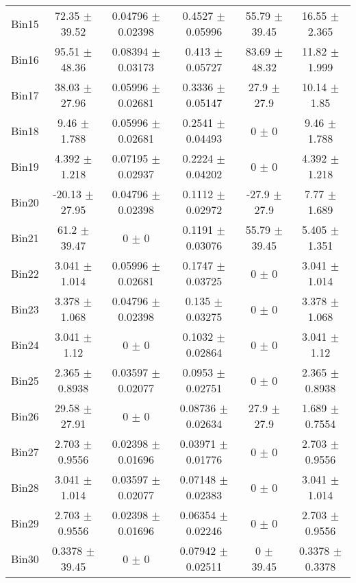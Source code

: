 \begin{tabular}{@{\extracolsep{4pt}}lccccc@{}}
     Bin15 & 72.35 $\pm$ 39.52 & 0.04796 $\pm$ 0.02398 & 0.4527 $\pm$ 0.05996 & 55.79 $\pm$ 39.45 & 16.55 $\pm$ 2.365 \\ 
     Bin16 & 95.51 $\pm$ 48.36 & 0.08394 $\pm$ 0.03173 & 0.413 $\pm$ 0.05727 & 83.69 $\pm$ 48.32 & 11.82 $\pm$ 1.999 \\ 
     Bin17 & 38.03 $\pm$ 27.96 & 0.05996 $\pm$ 0.02681 & 0.3336 $\pm$ 0.05147 & 27.9 $\pm$ 27.9 & 10.14 $\pm$ 1.85 \\ 
     Bin18 & 9.46 $\pm$ 1.788 & 0.05996 $\pm$ 0.02681 & 0.2541 $\pm$ 0.04493 & 0 $\pm$ 0 & 9.46 $\pm$ 1.788 \\ 
     Bin19 & 4.392 $\pm$ 1.218 & 0.07195 $\pm$ 0.02937 & 0.2224 $\pm$ 0.04202 & 0 $\pm$ 0 & 4.392 $\pm$ 1.218 \\ 
     Bin20 & -20.13 $\pm$ 27.95 & 0.04796 $\pm$ 0.02398 & 0.1112 $\pm$ 0.02972 & -27.9 $\pm$ 27.9 & 7.77 $\pm$ 1.689 \\ 
     Bin21 & 61.2 $\pm$ 39.47 & 0 $\pm$ 0 & 0.1191 $\pm$ 0.03076 & 55.79 $\pm$ 39.45 & 5.405 $\pm$ 1.351 \\ 
     Bin22 & 3.041 $\pm$ 1.014 & 0.05996 $\pm$ 0.02681 & 0.1747 $\pm$ 0.03725 & 0 $\pm$ 0 & 3.041 $\pm$ 1.014 \\ 
     Bin23 & 3.378 $\pm$ 1.068 & 0.04796 $\pm$ 0.02398 & 0.135 $\pm$ 0.03275 & 0 $\pm$ 0 & 3.378 $\pm$ 1.068 \\ 
     Bin24 & 3.041 $\pm$ 1.12 & 0 $\pm$ 0 & 0.1032 $\pm$ 0.02864 & 0 $\pm$ 0 & 3.041 $\pm$ 1.12 \\ 
     Bin25 & 2.365 $\pm$ 0.8938 & 0.03597 $\pm$ 0.02077 & 0.0953 $\pm$ 0.02751 & 0 $\pm$ 0 & 2.365 $\pm$ 0.8938 \\ 
     Bin26 & 29.58 $\pm$ 27.91 & 0 $\pm$ 0 & 0.08736 $\pm$ 0.02634 & 27.9 $\pm$ 27.9 & 1.689 $\pm$ 0.7554 \\ 
     Bin27 & 2.703 $\pm$ 0.9556 & 0.02398 $\pm$ 0.01696 & 0.03971 $\pm$ 0.01776 & 0 $\pm$ 0 & 2.703 $\pm$ 0.9556 \\ 
     Bin28 & 3.041 $\pm$ 1.014 & 0.03597 $\pm$ 0.02077 & 0.07148 $\pm$ 0.02383 & 0 $\pm$ 0 & 3.041 $\pm$ 1.014 \\ 
     Bin29 & 2.703 $\pm$ 0.9556 & 0.02398 $\pm$ 0.01696 & 0.06354 $\pm$ 0.02246 & 0 $\pm$ 0 & 2.703 $\pm$ 0.9556 \\ 
     Bin30 & 0.3378 $\pm$ 39.45 & 0 $\pm$ 0 & 0.07942 $\pm$ 0.02511 & 0 $\pm$ 39.45 & 0.3378 $\pm$ 0.3378 \\ 
\hline\hline
  \end{tabular}
